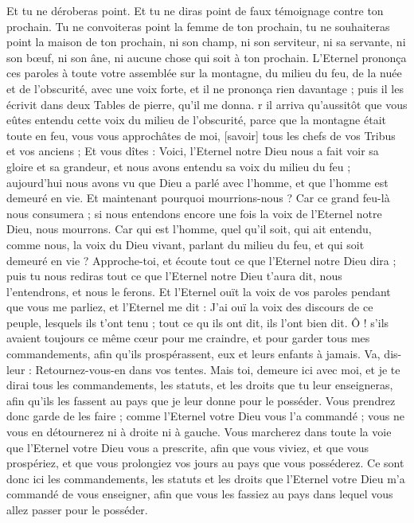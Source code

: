 \begin{multicols}{2}
Et tu ne déroberas point.
Et tu ne diras point de faux témoignage contre ton prochain.
Tu ne convoiteras point la femme de ton prochain, tu ne souhaiteras point la maison de ton prochain, ni son champ, ni son serviteur, ni sa servante, ni son bœuf, ni son âne, ni aucune chose qui soit à ton prochain.
L'Eternel prononça ces paroles à toute votre assemblée sur la montagne, du milieu du feu, de la nuée et de l'obscurité, avec une voix forte, et il ne prononça rien davantage ; puis il les écrivit dans deux Tables de pierre, qu'il me donna.
r il arriva qu'aussitôt que vous eûtes entendu cette voix du milieu de l'obscurité, parce que la montagne était toute en feu, vous vous approchâtes de moi, [savoir] tous les chefs de vos Tribus et vos anciens ;
Et vous dîtes : Voici, l'Eternel notre Dieu nous a fait voir sa gloire et sa grandeur, et nous avons entendu sa voix du milieu du feu ; aujourd'hui nous avons vu que Dieu a parlé avec l'homme, et que l'homme est demeuré en vie.
Et maintenant pourquoi mourrions-nous ? Car ce grand feu-là nous consumera ; si nous entendons encore une fois la voix de l'Eternel notre Dieu, nous mourrons.
Car qui est l'homme, quel qu'il soit, qui ait entendu, comme nous, la voix du Dieu vivant, parlant du milieu du feu, et qui soit demeuré en vie ?
Approche-toi, et écoute tout ce que l'Eternel notre Dieu dira ; puis tu nous rediras tout ce que l'Eternel notre Dieu t'aura dit, nous l'entendrons, et nous le ferons.
Et l'Eternel ouït la voix de vos paroles pendant que vous me parliez, et l'Eternel me dit : J'ai ouï la voix des discours de ce peuple, lesquels ils t'ont tenu ; tout ce qu ils ont dit, ils l'ont bien dit.
Ô ! s'ils avaient toujours ce même cœur pour me craindre, et pour garder tous mes commandements, afin qu'ils prospérassent, eux et leurs enfants à jamais.
Va, dis-leur : Retournez-vous-en dans vos tentes.
Mais toi, demeure ici avec moi, et je te dirai tous les commandements, les statuts, et les droits que tu leur enseigneras, afin qu'ils les fassent au pays que je leur donne pour le posséder.
Vous prendrez donc garde de les faire ; comme l'Eternel votre Dieu vous l'a commandé ; vous ne vous en détournerez ni à droite ni à gauche.
Vous marcherez dans toute la voie que l'Eternel votre Dieu vous a prescrite, afin que vous viviez, et que vous prospériez, et que vous prolongiez vos jours au pays que vous posséderez.
\VerseOne{}Ce sont donc ici les commandements, les statuts et les droits que l'Eternel votre Dieu m'a commandé de vous enseigner, afin que vous les fassiez au pays dans lequel vous allez passer pour le posséder.

\end{multicols}
